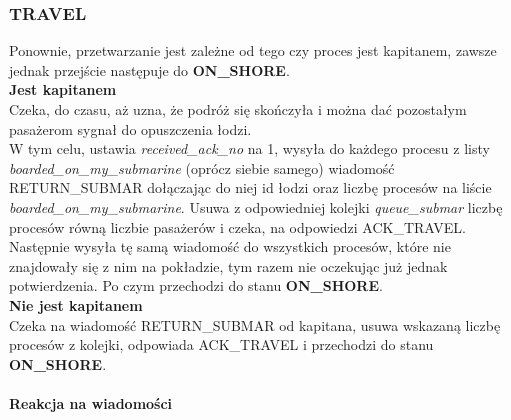 \documentclass[a4paper]{article}
\begin{document}
\resetlinenumber[1]\linenumbers
\subsubsection{\textbf{TRAVEL}}
Ponownie, przetwarzanie jest zależne od tego czy proces jest kapitanem, zawsze jednak przejście następuje do \textbf{ON\_SHORE}.
\\
\textbf{Jest kapitanem}\\
Czeka, do czasu, aż uzna, że podróż się skończyła i można dać pozostałym pasażerom sygnał do opuszczenia łodzi.\\
W tym celu, ustawia \textit{received\_ack\_no} na 1, wysyła do każdego procesu z listy \textit{boarded\_on\_my\_submarine} (oprócz siebie samego) wiadomość RETURN\_SUBMAR dołączając do niej id łodzi oraz liczbę procesów na liście \textit{boarded\_on\_my\_submarine}.
Usuwa z odpowiedniej kolejki \textit{queue\_submar} liczbę procesów równą liczbie pasażerów i czeka, na odpowiedzi ACK\_TRAVEL.\\
Następnie wysyła tę samą wiadomość do wszystkich procesów, które nie znajdowały się z nim na pokładzie, tym razem nie oczekując już jednak potwierdzenia.
Po czym przechodzi do stanu \textbf{ON\_SHORE}.
\\
\textbf{Nie jest kapitanem}\\
Czeka na wiadomość RETURN\_SUBMAR od kapitana, usuwa wskazaną liczbę procesów z kolejki, odpowiada ACK\_TRAVEL i przechodzi do stanu \textbf{ON\_SHORE}.
\\
\\
\textbf{Reakcja na wiadomości}
\end{document}
